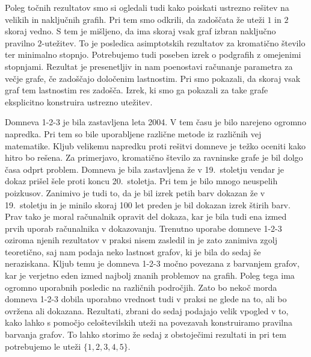 \documentclass[12pt,a4paper,twoside]{article}
\newcommand{\literatura}{literatura}  %
\theoremstyle{definition} %
\theoremstyle{plain} %
\numberwithin{equation}{section}  %
\begin{document}
Poleg točnih rezultatov smo si ogledali tudi kako poiskati ustrezno rešitev na velikih in naključnih grafih. Pri tem smo odkrili, da zadoščata že uteži $1$ in $2$ skoraj vedno. S tem je mišljeno, da ima skoraj vsak graf izbran naključno pravilno $2$-utežitev. To je posledica asimptotskih rezultatov za kromatično število ter minimalno stopnjo. Potrebujemo tudi poseben izrek o podgrafih z omejenimi stopnjami. Rezultat je presenetljiv in nam poenostavi računanje parametra za večje grafe, če zadoščajo določenim lastnostim. Pri smo pokazali, da skoraj vsak graf tem lastnostim res zadošča. Izrek, ki smo ga pokazali za take grafe eksplicitno konstruira ustrezno utežitev.

Domneva 1-2-3 je bila zastavljena leta 2004. V tem času je bilo narejeno ogromno napredka. Pri tem so bile uporabljene različne metode iz različnih vej matematike. Kljub velikemu napredku proti rešitvi domneve je težko oceniti kako hitro bo rešena. Za primerjavo, kromatično število za ravninske grafe je bil dolgo časa odprt problem. Domneva je bila zastavljena že v 19.\ stoletju vendar je dokaz prišel šele proti koncu 20.\ stoletja. Pri tem je bilo mnogo neuspelih poizkusov. Zanimivo je tudi to, da je bil izrek petih barv dokazan že v 19.\ stoletju in je minilo skoraj 100 let preden je bil dokazan izrek štirih barv. Prav tako je moral računalnik opravit del dokaza, kar je bila tudi ena izmed prvih uporab računalnika v dokazovanju. Trenutno uporabe domneve 1-2-3 oziroma njenih rezultatov v praksi nisem zasledil in je zato zanimiva zgolj teoretično, saj nam podaja neko lastnost grafov, ki je bila do sedaj še neraziskana. Kljub temu je domneva 1-2-3 močno povezana z barvanjem grafov, kar je verjetno eden izmed najbolj znanih problemov na grafih. Poleg tega ima ogromno uporabnih posledic na različnih področjih. Zato bo nekoč morda domneva 1-2-3 dobila uporabno vrednost tudi v praksi ne glede na to, ali bo ovržena ali dokazana. Rezultati, zbrani do sedaj podajajo velik vpogled v to, kako lahko s pomočjo celoštevilskih uteži na povezavah konstruiramo pravilna barvanja grafov. To lahko storimo že sedaj z obstoječimi rezultati in pri tem potrebujemo le uteži $\{1,2,3,4,5\}$.


 
\cleardoublepage                           %

\cleardoublepage                           %
\printindex
\end{document}
